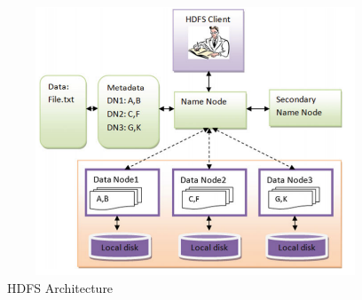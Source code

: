 \begin{figure}[H]
\begin{center}
\includegraphics[width=13.8cm,height=8cm]{chapter2/fig2.png}
\end{center}
\caption{HDFS Architecture}
\label{hdfsarch}
\end{figure}

